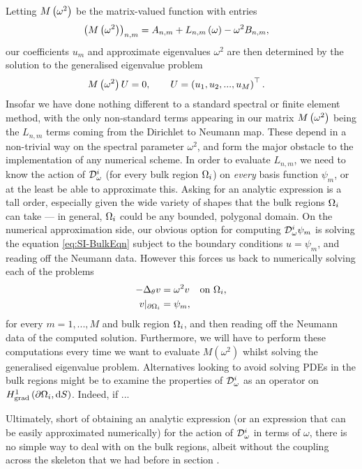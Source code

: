 Letting $M\left( \omega^2 \right)$ be the matrix-valued function with entries
\begin{align*}
	\left( M\left( \omega^2 \right) \right)_{n,m} &= A_{n,m} + L_{n,m}\left( \omega \right) - \omega^2 B_{n,m},
\end{align*}
our coefficients $u_m$ and approximate eigenvalues $\omega^2$ are then determined by the solution to the generalised eigenvalue problem
\begin{align*}
	M\left( \omega^2 \right)U &= 0,
	\qquad
	U = \left( u_1, u_2, ... , u_M \right)^{\top}.
\end{align*}
Insofar we have done nothing different to a standard spectral or finite element method, with the only non-standard terms appearing in our matrix $M\left( \omega^2 \right)$ being the $L_{n,m}$ terms coming from the Dirichlet to Neumann map.
These depend in a non-trivial way on the spectral parameter $\omega^2$, and form the major obstacle to the implementation of any numerical scheme.
In order to evaluate $L_{n,m}$, we need to know the action of $\mathcal{D}_{\omega}^i$ (for every bulk region $\Omega_i$) on \emph{every} basis function $\psi_m$, or at the least be able to approximate this.
Asking for an analytic expression is a tall order, especially given the wide variety of shapes that the bulk regions $\Omega_i$ can take --- in general, $\Omega_i$ could be any bounded, polygonal domain.
On the numerical approximation side, our obvious option for computing $\mathcal{D}^i_\omega\psi_m$ is solving the equation \eqref{eq:SI-BulkEqn} subject to the boundary conditions $u=\psi_m$, and reading off the Neumann data.
However this forces us back to numerically solving each of the problems
\begin{align*}
	-\Delta_{\theta}v &= \omega^2 v &\text{on } \Omega_i, \\
	v\vert_{\partial\Omega_i} &= \psi_m,
\end{align*}
for every $m=1,...,M$ and bulk region $\Omega_i$, and then reading off the Neumann data of the computed solution.
Furthermore, we will have to perform these computations every time we want to evaluate $M(\omega^2)$ whilst solving the generalised eigenvalue problem.
Alternatives looking to avoid solving PDEs in the bulk regions might be to examine the properties of $\mathcal{D}^i_\omega$ as an operator on $H^1_\mathrm{grad}\left( \partial\Omega_i, \mathrm{d}S \right)$.
Indeed, if ...

Ultimately, short of obtaining an analytic expression (or an expression that can be easily approximated numerically) for the action of $\mathcal{D}^i_{\omega}$ in terms of $\omega$, there is no simple way to deal with
 on the bulk regions, albeit without the coupling across the skeleton that we had before in section .

